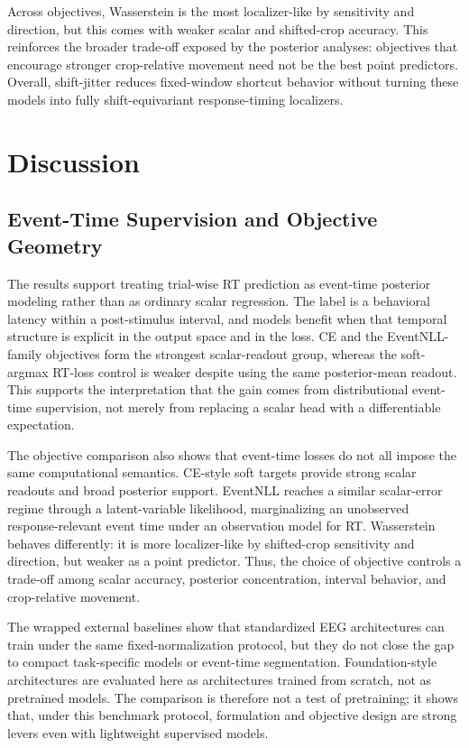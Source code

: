 \documentclass[12pt]{article}
\begin{document}
Across objectives, Wasserstein is the most localizer-like by sensitivity and direction, but this comes with weaker scalar and shifted-crop accuracy. This reinforces the broader trade-off exposed by the posterior analyses: objectives that encourage stronger crop-relative movement need not be the best point predictors. Overall, shift-jitter reduces fixed-window shortcut behavior without turning these models into fully shift-equivariant response-timing localizers.

\FloatBarrier

\section{Discussion}

\subsection{Event-Time Supervision and Objective Geometry}

The results support treating trial-wise RT prediction as event-time posterior modeling rather than as ordinary scalar regression. The label is a behavioral latency within a post-stimulus interval, and models benefit when that temporal structure is explicit in the output space and in the loss. CE and the EventNLL-family objectives form the strongest scalar-readout group, whereas the soft-argmax RT-loss control is weaker despite using the same posterior-mean readout. This supports the interpretation that the gain comes from distributional event-time supervision, not merely from replacing a scalar head with a differentiable expectation.

The objective comparison also shows that event-time losses do not all impose the same computational semantics. CE-style soft targets provide strong scalar readouts and broad posterior support. EventNLL reaches a similar scalar-error regime through a latent-variable likelihood, marginalizing an unobserved response-relevant event time under an observation model for RT. Wasserstein behaves differently: it is more localizer-like by shifted-crop sensitivity and direction, but weaker as a point predictor. Thus, the choice of objective controls a trade-off among scalar accuracy, posterior concentration, interval behavior, and crop-relative movement.

The wrapped external baselines show that standardized EEG architectures can train under the same fixed-normalization protocol, but they do not close the gap to compact task-specific models or event-time segmentation. Foundation-style architectures are evaluated here as architectures trained from scratch, not as pretrained models. The comparison is therefore not a test of pretraining; it shows that, under this benchmark protocol, formulation and objective design are strong levers even with lightweight supervised models.
\end{document}
